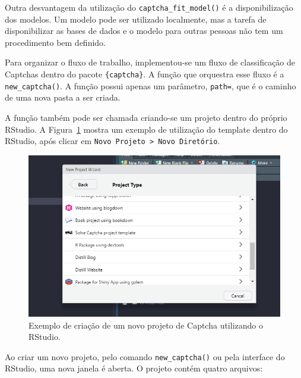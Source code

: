 \documentclass[12pt,twoside,brazilian]{book}
\begin{document}
Outra desvantagem da utilização do \texttt{captcha\_fit\_model()} é a
disponibilização dos modelos. Um modelo pode ser utilizado localmente,
mas a tarefa de disponibilizar as bases de dados e o modelo para outras
pessoas não tem um procedimento bem definido.

Para organizar o fluxo de trabalho, implementou-se um fluxo de
classificação de Captchas dentro do pacote \texttt{\{captcha\}}. A
função que orquestra esse fluxo é a \texttt{new\_captcha()}. A função
possui apenas um parâmetro, \texttt{path=}, que é o caminho de uma nova
pasta a ser criada.

A função também pode ser chamada criando-se um projeto dentro do próprio
RStudio. A Figura~\ref{fig-exemplo-rstudio-template} mostra um exemplo
de utilização do template dentro do RStudio, após clicar em
\texttt{Novo\ Projeto\ \textgreater{}\ Novo\ Diretório}.

\begin{figure}

{\centering \includegraphics{./assets/img/exemplo-rstudio-template.png}

}

\caption{\label{fig-exemplo-rstudio-template}Exemplo de criação de um
novo projeto de Captcha utilizando o RStudio.}

\end{figure}

Ao criar um novo projeto, pelo comando \texttt{new\_captcha()} ou pela
interface do RStudio, uma nova janela é aberta. O projeto contém quatro
arquivos:
\end{document}
